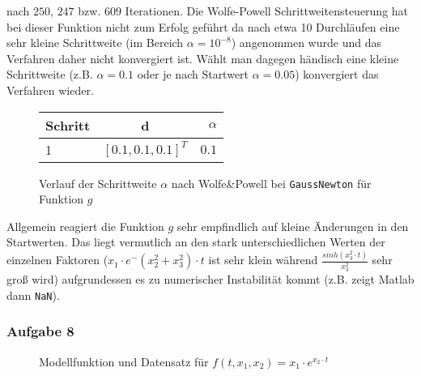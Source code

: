\documentclass[a4paper, 12pt]{report}
\begin{document}
nach $250$, $247$ bzw. $609$ Iterationen. Die Wolfe-Powell Schrittweitensteuerung hat bei dieser Funktion nicht zum Erfolg geführt
da nach etwa 10 Durchläufen eine sehr kleine Schrittweite (im Bereich $\alpha = 10^{-8}$) angenommen wurde und das Verfahren daher
nicht konvergiert ist. Wählt man dagegen händisch eine kleine Schrittweite (z.B. $\alpha = 0.1$ oder je nach Startwert $\alpha = 0.05$)
konvergiert das Verfahren wieder.\par

\begin{figure}[H]
  \centering
  \def\arraystretch{1.25}
  \begin{tabular}{l|c|r}
    \hline
    \textbf{Schritt} & \textbf{d} & \textbf{$\alpha$}\\
    \hline
    1 & $[0.1, 0.1, 0.1]^T$ & $0.1$\\
    \hline
  \end{tabular}
  \caption{Verlauf der Schrittweite $\alpha$ nach Wolfe\&Powell bei
  \lstinline[basicstyle=\ttfamily\color{black}]|GaussNewton| für Funktion $g$}
\end{figure}

Allgemein reagiert die Funktion $g$ sehr empfindlich auf kleine Änderungen in den Startwerten. Das liegt vermutlich an den
stark unterschiedlichen Werten der einzelnen Faktoren ($x_1\cdot e^-{ (x_2^2 + x_3^2)\cdot t}$ ist sehr klein während
$\frac{sinh(x_3^2\cdot t)}{x_3^2}$ sehr groß wird) aufgrundessen es zu numerischer Instabilität kommt (z.B. zeigt Matlab
dann \lstinline[basicstyle=\ttfamily\color{black}]|NaN|).


\subsubsection{Aufgabe 8}

\begin{figure}[H]
  \centering
  \caption{Modellfunktion und Datensatz für $f(t, x_1, x_2) = x_1\cdot e^{x_2\cdot t}$}
\end{figure}
\end{document}

